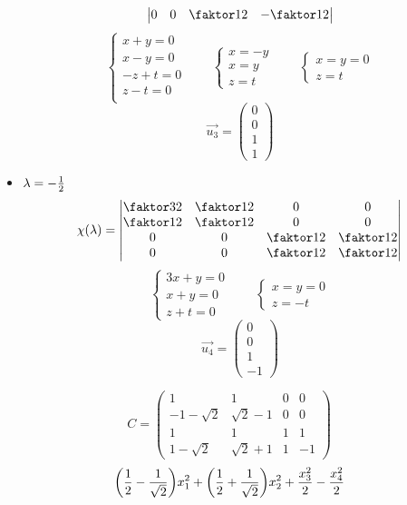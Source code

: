 \begin{itemize}
$$\begin{vmatrix}
        0 & 0 & \faktor12 & -\faktor12
    \end{vmatrix} $$
    $$
    \begin{cases}
    	x + y = 0 \\
        x - y = 0 \\
        -z + t = 0 \\
        z - t = 0 \\
    \end{cases} \qquad
    \begin{cases}
    	x = -y \\
        x = y \\
        z = t
    \end{cases} \qquad
    \begin{cases}
    	x = y = 0 \\
        z = t
    \end{cases} $$
    $$ \vec{u_3} =
    \begin{pmatrix}
    	0 \\
        0 \\
        1 \\
        1
    \end{pmatrix} $$
    \item $ \lambda = -\half $
    $$ \chi(\lambda) =
    \begin{vmatrix}
        \faktor32 & \faktor12 & 0 & 0 \\
        \faktor12 & \faktor12 & 0 & 0 \\
        0 & 0 & \faktor12 & \faktor12 \\
        0 & 0 & \faktor12 & \faktor12
    \end{vmatrix} $$
    $$
    \begin{cases}
    	3x + y = 0 \\
        x + y = 0 \\
        z + t = 0
    \end{cases} \qquad
    \begin{cases}
    	x = y = 0 \\
        z = -t
    \end{cases} $$
    $$ \vec{u_4} =
    \begin{pmatrix}
    	0 \\
        0 \\
        1 \\
        -1
    \end{pmatrix} $$
\end{itemize}
$$ C =
\begin{pmatrix}
	1 & 1 & 0 & 0 \\
    -1 - \sqrt2 & \sqrt2 - 1 & 0 & 0 \\
    1 & 1 & 1 & 1 \\
    1 - \sqrt2 & \sqrt2 + 1 & 1 & -1
\end{pmatrix} $$
$$ \bigg( \half - \frac1{\sqrt2} \bigg)x_1^2 + \bigg( \half + \frac1{\sqrt2} \bigg)x_2^2 + \half[x_3^2] - \half[x_4^2] $$

